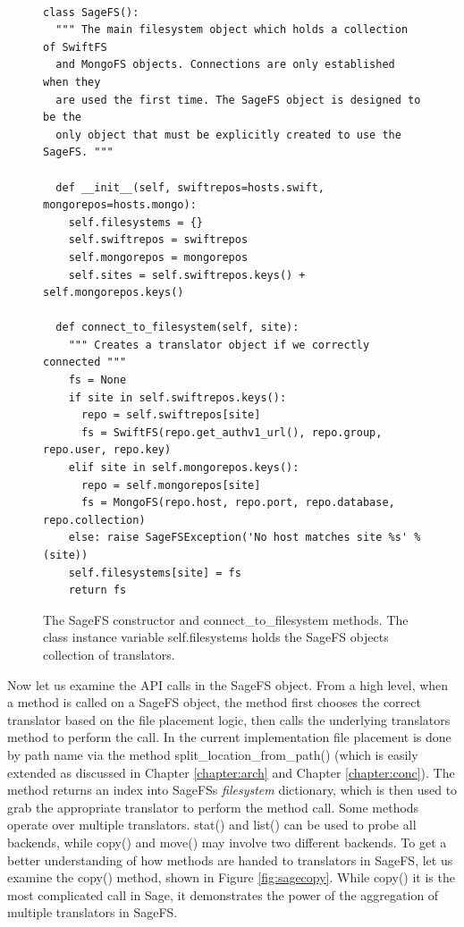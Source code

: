 \begin{figure}[h]
\begin{lstlisting}

class SageFS():
  """ The main filesystem object which holds a collection of SwiftFS
  and MongoFS objects. Connections are only established when they
  are used the first time. The SageFS object is designed to be the 
  only object that must be explicitly created to use the SageFS. """

  def __init__(self, swiftrepos=hosts.swift, mongorepos=hosts.mongo):
    self.filesystems = {}
    self.swiftrepos = swiftrepos
    self.mongorepos = mongorepos
    self.sites = self.swiftrepos.keys() + self.mongorepos.keys()

  def connect_to_filesystem(self, site):
    """ Creates a translator object if we correctly connected """
    fs = None
    if site in self.swiftrepos.keys():
      repo = self.swiftrepos[site]
      fs = SwiftFS(repo.get_authv1_url(), repo.group, repo.user, repo.key)
    elif site in self.mongorepos.keys():
      repo = self.mongorepos[site]
      fs = MongoFS(repo.host, repo.port, repo.database, repo.collection)
    else: raise SageFSException('No host matches site %s' % (site))
    self.filesystems[site] = fs
    return fs

\end{lstlisting}
\caption[SageFS Constructor]{The SageFS constructor and connect\_to\_filesystem methods. The class instance variable self.filesystems holds the SageFS objects collection of translators.}
\label{fig:sagefscode}
\end{figure}


Now let us examine the API calls in the SageFS object. From a high level, when a method is called on a SageFS object, the method first chooses the correct translator based on the file placement logic, then calls the underlying translators method to perform the call. In the current implementation file placement is done by path name via the method split\_location\_from\_path() (which is easily extended as discussed in Chapter \ref{chapter:arch} and Chapter \ref{chapter:conc}). The method returns an index into SageFSs \textit{filesystem} dictionary, which is then used to grab the appropriate translator to perform the method call. Some methods operate over multiple translators. stat() and list() can be used to probe all backends, while copy() and move() may involve two different backends. To get a better understanding of how methods are handed to translators in SageFS, let us examine the copy() method, shown in Figure \ref{fig:sagecopy}. While copy() it is the most complicated call in Sage, it demonstrates the power of the aggregation of multiple translators in SageFS. 

